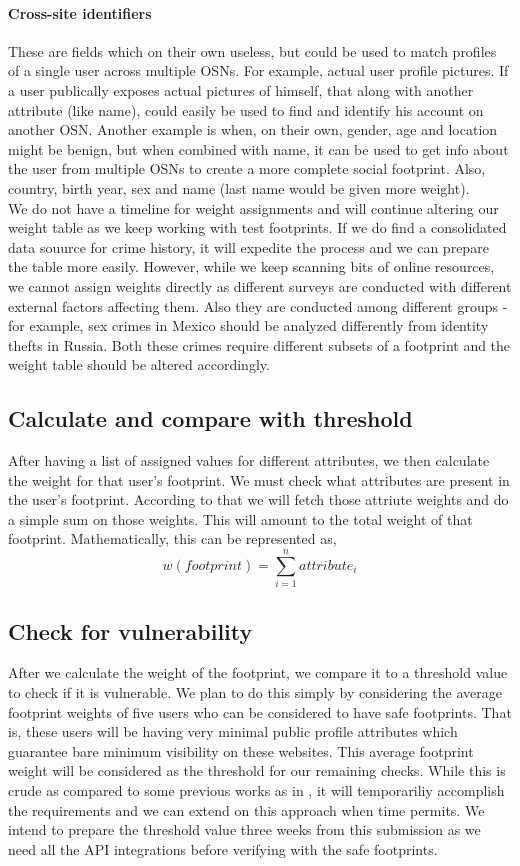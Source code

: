 \documentclass[10pt,conference]{IEEEtran}
\begin{document}
\paragraph*{Cross-site identifiers}  These are fields which on their own useless, but could be used to match profiles of a single user across multiple OSNs. For example, actual user profile pictures. If a user publically exposes actual pictures of himself, that along with another attribute (like name), could easily be used to find and identify his account on another OSN. Another example is when, on their own, gender, age and location might be benign, but when combined with name, it can be used to get info about the user from multiple OSNs to create a more complete social footprint. Also, country, birth year, sex and name (last name would be given more weight).\\
We do not have a timeline for weight assignments and will continue altering our weight table as we keep working with test footprints. If we do find a consolidated data souurce for crime history, it will expedite the process and we can prepare the table more easily. However, while we keep scanning bits of online resources, we cannot assign weights directly as different surveys are conducted with different external factors affecting them. Also they are conducted among different groups - for example, sex crimes in Mexico should be analyzed differently from identity thefts in Russia. Both these crimes require different subsets of a footprint and the weight table should be altered accordingly.
\subsection{Calculate and compare with threshold}
After having a list of assigned values for different attributes, we then calculate the weight for that user's footprint. We must check what attributes are present in the user's footprint. According to that we will fetch those attriute weights and do a simple sum on those weights. This will amount to the total weight of that footprint.
Mathematically, this can be represented as,
\begin{equation}
w(footprint) = \sum_{i=1}^{n}attribute_i
\end{equation}
\subsection{Check for vulnerability}
After we calculate the weight of the footprint, we compare it to a threshold value to check if it is vulnerable. We plan to do this simply by considering the average footprint weights of five users who can be considered to have safe footprints. That is, these users will be having very minimal public profile attributes which guarantee bare minimum visibility on these websites. This average footprint weight will be considered as the threshold for our remaining checks. While this is crude as compared to some previous works as in \cite{pidx}, it will temporariliy accomplish the requirements and we can extend on this approach when time permits. We intend to prepare the threshold value three weeks from this submission as we need all the API integrations before verifying with the safe footprints.
\end{document}
